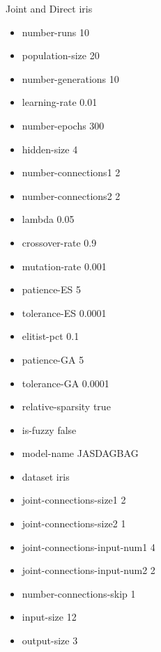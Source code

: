 Joint and Direct
iris
\begin{itemize}
\item number-runs 10
\item population-size 20
\item number-generations 10
\item learning-rate 0.01
\item number-epochs 300
\item hidden-size 4
\item number-connections1 2
\item number-connections2 2
\item lambda 0.05
\item crossover-rate 0.9
\item mutation-rate 0.001
\item patience-ES 5
\item tolerance-ES 0.0001
\item elitist-pct 0.1
\item patience-GA 5
\item tolerance-GA 0.0001
\item relative-sparsity true
\item is-fuzzy false
\item model-name JASDAGBAG
\item dataset iris
\item joint-connections-size1 2
\item joint-connections-size2 1
\item joint-connections-input-num1 4
\item joint-connections-input-num2 2
\item number-connections-skip 1
\item input-size 12
\item output-size 3
\end{itemize}

